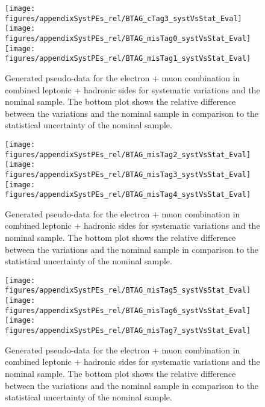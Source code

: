 \begin{figure}[!hb]
\begin{center}
        \texttt{[image: figures/appendixSystPEs\_rel/BTAG\_cTag3\_systVsStat\_Eval]}\\
        \texttt{[image: figures/appendixSystPEs\_rel/BTAG\_misTag0\_systVsStat\_Eval]}\\
        \texttt{[image: figures/appendixSystPEs\_rel/BTAG\_misTag1\_systVsStat\_Eval]}
  
        \caption{Generated pseudo-data for the electron + muon combination in combined leptonic + hadronic sides for systematic variations and the nominal \ttbar sample. The bottom plot shows the relative difference between the variations and the nominal sample in comparison to the statistical uncertainty of the nominal sample.}   
        \label{fig:systematicVar_lephad_Btag_2_2}
        \end{center}                          
        \end{figure}

\begin{figure}[!hb]
\begin{center}
        \texttt{[image: figures/appendixSystPEs\_rel/BTAG\_misTag2\_systVsStat\_Eval]}\\
        \texttt{[image: figures/appendixSystPEs\_rel/BTAG\_misTag3\_systVsStat\_Eval]}\\
        \texttt{[image: figures/appendixSystPEs\_rel/BTAG\_misTag4\_systVsStat\_Eval]}
  
        \caption{Generated pseudo-data for the electron + muon combination in combined leptonic + hadronic sides for systematic variations and the nominal \ttbar sample. The bottom plot shows the relative difference between the variations and the nominal sample in comparison to the statistical uncertainty of the nominal sample.}   
        \label{fig:systematicVar_lephad_Btag_3_1}
        \end{center}                          
        \end{figure}


\begin{figure}[!hb]
\begin{center}
        \texttt{[image: figures/appendixSystPEs\_rel/BTAG\_misTag5\_systVsStat\_Eval]}\\
        \texttt{[image: figures/appendixSystPEs\_rel/BTAG\_misTag6\_systVsStat\_Eval]}\\
        \texttt{[image: figures/appendixSystPEs\_rel/BTAG\_misTag7\_systVsStat\_Eval]}
  
        \caption{Generated pseudo-data for the electron + muon combination in combined leptonic + hadronic sides for systematic variations and the nominal \ttbar sample. The bottom plot shows the relative difference between the variations and the nominal sample in comparison to the statistical uncertainty of the nominal sample.}   
        \label{fig:systematicVar_lephad_Btag_3_2}
        \end{center}                          
        \end{figure}

